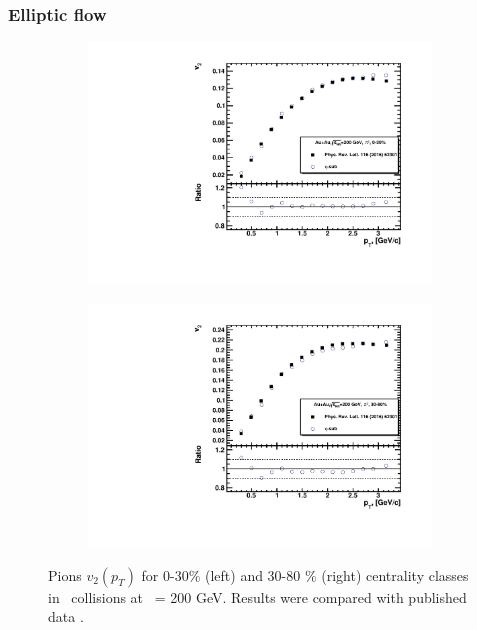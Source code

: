 \FloatBarrier
\subsubsection{Elliptic flow}

\begin{figure}[ht]
    \begin{subfigure}{.49\textwidth}
        \centering
        \includegraphics[width=1.\linewidth]{Figures/v2_pions_pt_cent0.pdf}
    \end{subfigure}
    \begin{subfigure}{.49\textwidth}
        \centering
        \includegraphics[width=1.\linewidth]{Figures/v2_pions_pt_cent1.pdf}
    \end{subfigure}
    \label{fig:v2_EP_Pions}
    \caption{Pions $v_2(p_T)$ for 0-30\% (left) and 30-80 \% (right) centrality classes in \AuAu\ collisions at \sNN\ = 200 GeV. Results were compared with published data \cite{Adamczyk:2015ukd}.}
\end{figure}


